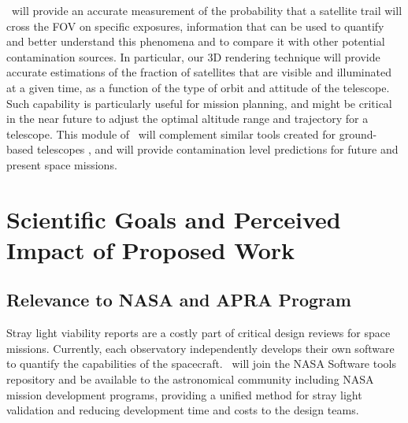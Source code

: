 \documentclass[usenames,dvipsnames,modern]{CLASS_FILES/aastex631}  %
\begin{document}
\MyName\ will provide an accurate measurement of the probability that a satellite trail will cross the FOV on specific exposures, information that can be used to quantify and better understand this phenomena and to compare it with other potential contamination sources. In particular, our 3D rendering technique will provide accurate estimations of the fraction of satellites that are visible and illuminated at a given time, as a function of the type of orbit and attitude of the telescope. Such capability is particularly useful for mission planning, and might be critical in the near future to adjust the optimal altitude range and trajectory for a telescope. This module of \MyName\ will complement similar tools created for ground-based telescopes \citep{lawler+2021inproceedings_303, osborn+2022mnras509_1848}, and will provide contamination level predictions for future and present space missions.




\section{Scientific Goals and Perceived Impact of Proposed Work}
\label{Sec:Summary}

\subsection{Relevance to NASA and APRA Program}
Stray light viability reports are a costly part of critical design reviews for space missions. Currently, each observatory independently develops their own software to quantify the capabilities of the spacecraft. \MyName\ will join the NASA Software tools repository and be available to the astronomical community including NASA mission development programs, providing a unified method for stray light validation and reducing development time and costs to the design teams.\\
\end{document}
